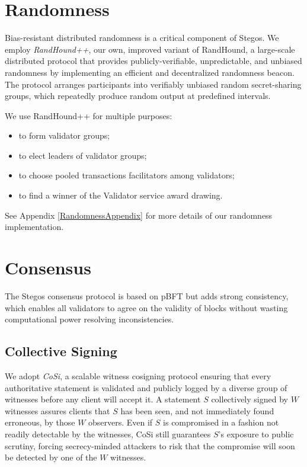 \documentclass[a4paper, 10pt, conference]{ieeeconf}
\begin{document}
\section{Randomness}\label{Randomness} 

Bias-resistant distributed randomness is a critical component of Stegos. We employ \textit{RandHound++}, our own, improved variant of RandHound\cite{c12}, a large-scale distributed protocol that provides publicly-verifiable, unpredictable, and unbiased randomness by implementing an efficient and decentralized randomness beacon. The protocol arranges participants into verifiably unbiased random secret-sharing groups, which repeatedly produce random output at predefined intervals. 

We use RandHound++ for multiple purposes:

\begin{itemize}
	\item {to form validator groups;}
	\item {to elect leaders of validator groups;} 
	\item {to choose pooled transactions facilitators among validators;}
	\item {to find a winner of the Validator service award drawing.}
\end{itemize}

See Appendix \ref{RandomnessAppendix} for more details of our randomness implementation. 

\section{Consensus}\label{Consensus}

The Stegos consensus protocol is based on pBFT\cite{c9} but adds strong consistency, which enables all validators to agree on the validity of blocks without wasting computational power resolving inconsistencies. 

\subsection{Collective Signing}
We adopt \textit{CoSi}\cite{c10}\cite{c11}, a scalable witness cosigning protocol ensuring that every authoritative statement is validated and publicly logged by a diverse group of witnesses before any client will accept it. A statement $S$ collectively signed by $W$ witnesses assures clients that $S$ has been seen, and not immediately found erroneous, by those $W$ observers. Even if $S$ is compromised in a fashion not readily detectable by the witnesses, CoSi still guarantees $S$’s exposure to public scrutiny, forcing secrecy-minded attackers to risk that the compromise will soon be detected by one of the $W$ witnesses. 
\end{document}
